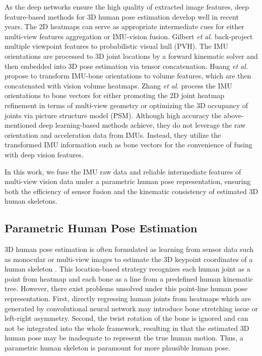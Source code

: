 \documentclass[lettersize,journal]{IEEEtran}
\begin{document}
As the deep networks ensure the high quality of extracted image features, deep feature-based methods for 3D human pose estimation develop well in recent years. The 2D heatmaps can serve as appropriate intermediate cues for either multi-view features aggregation or IMU-vision fusion. Gilbert \emph{et al.} \cite{gilbert2019fusing} back-project multiple viewpoint features to probabilistic visual hull (PVH). The IMU orientations are processed to 3D joint locations by a forward kinematic solver and then embedded into 3D pose estimation via tensor concatenation. Huang \emph{et al.} \cite{huang2020deepfuse} propose to transform IMU-bone orientations to volume features, which are then concatenated with vision volume heatmaps. Zhang \emph{et al.} \cite{zhang2020fusing} process the IMU orientations to bone vectors for either promoting the 2D joint heatmap refinement in terms of multi-view geometry or optimizing the 3D occupancy of joints via picture structure model (PSM). Although high accuracy the above-mentioned deep learning-based methods achieve, they do not leverage the raw orientation and acceleration data from IMUs. Instead, they utilize the transformed IMU information such as bone vectors for the convenience of fusing with deep vision features. 

In this work, we fuse the IMU raw data and reliable intermediate features of multi-view vision data under a parametric human pose representation, ensuring both the efficiency of sensor fusion and the kinematic consistency of estimated 3D human skeletons.
 
\subsection{Parametric Human Pose Estimation}

3D human pose estimation is often formulated as learning from sensor data such as monocular or multi-view images to estimate the 3D keypoint coordinates of a human skeleton \cite{li2021human,iskakov2019learnable,martinez2017simple}. This location-based strategy recognizes each human joint as a point from heatmap and each bone as a line from a predefined human kinematic tree. However, there exist problems unsolved under this point-line human pose representation. First, directly regressing human joints from heatmaps which are generated by convolutional neural network may introduce bone stretching issue\cite{holden2016deep,holden2017phase} or left-right asymmetry\cite{dabral2018learning}. Second, the twist rotation of the bone is ignored and can not be integrated into the whole framework, resulting in that the estimated 3D human pose may be inadequate to represent the true human motion\cite{li2021hybrik}. Thus, a parametric human skeleton is paramount for more plausible human pose.
\end{document}
